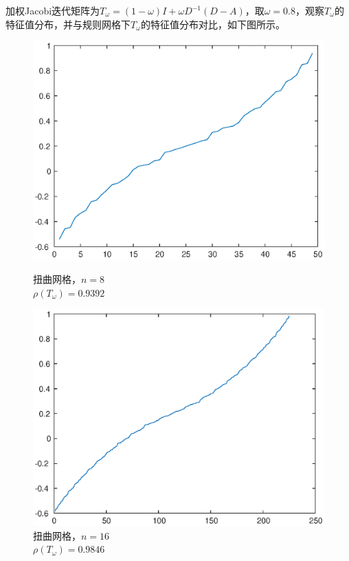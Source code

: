 \documentclass[lang=cn,10pt]{elegantbook}
\begin{document}
加权Jacobi迭代矩阵为$T_\omega=(1-\omega)I+\omega D^{-1}(D-A)$，取$\omega=0.8$，观察$T_\omega$的特征值分布，并与规则网格下$T_\omega$的特征值分布对比，如下图所示。
\begin{figure}[H]
  \centering
  \begin{minipage}[t]{0.28\linewidth}
      \centering
      \includegraphics[width=0.9\linewidth]{figure/3-t-1.eps}
      \caption*{\small 扭曲网格，$n=8$ \\ $\rho(T_\omega)=0.9392$}
  \end{minipage}
  \hspace{1em}
  \begin{minipage}[t]{0.28\linewidth}
    \centering
    \includegraphics[width=0.9\linewidth]{figure/3-t-2.eps}
    \caption*{\small 扭曲网格，$n=16$ \\ $\rho(T_\omega)=0.9846$}
  \end{minipage}

\end{figure}
\end{document}
